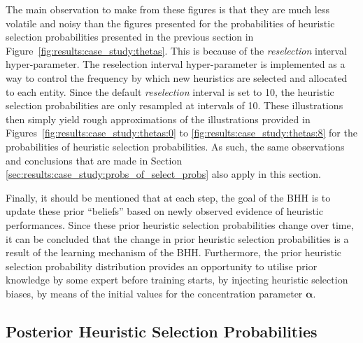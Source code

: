 The main observation to make from these figures is that they are much less volatile and noisy than the figures presented for the probabilities of heuristic selection probabilities presented in the previous section in Figure~\ref{fig:results:case_study:thetas}. This is because of the \textit{reselection} interval hyper-parameter. The reselection interval hyper-parameter is implemented as a way to control the frequency by which new heuristics are selected and allocated to each entity. Since the default \textit{reselection} interval is set to 10, the heuristic selection probabilities are only resampled at intervals of 10. These illustrations then simply yield rough approximations of the illustrations provided in Figures~\ref{fig:results:case_study:thetas:0} to \ref{fig:results:case_study:thetas:8} for the probabilities of heuristic selection probabilities. As such, the same observations and conclusions that are made in Section \ref{sec:results:case_study:probs_of_select_probs} also apply in this section.

Finally, it should be mentioned that at each step, the goal of the \acs{BHH} is to update these prior ``beliefs'' based on newly observed evidence of heuristic performances. Since these prior heuristic selection probabilities change over time, it can be concluded that the change in prior heuristic selection probabilities is a result of the learning mechanism of the \acs{BHH}. Furthermore, the prior heuristic selection probability distribution provides an opportunity to utilise prior knowledge by some expert before training starts, by injecting heuristic selection biases, by means of the initial values for the concentration parameter $\boldsymbol{\alpha}$.




\subsection{Posterior Heuristic Selection Probabilities}\label{sec:results:case_study:posterior_selec_prob}

